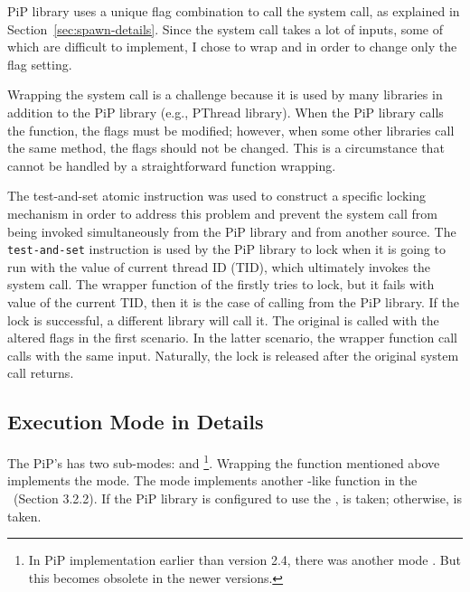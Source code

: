 PiP library uses a unique flag combination to call the
 system call, as explained in
Section~\ref{sec:spawn-details}. Since the  system
call takes a lot of inputs, some of which are difficult to implement,
I chose to wrap  and  in
order to change only the flag setting.   

Wrapping the  system call is a challenge because it
is used by many libraries in addition to the PiP library (e.g.,
PThread library). When the PiP library calls the function, the flags
must be modified; however, when some other libraries call the same
method, the flags should not be changed. This is a circumstance that
cannot be handled by a straightforward function wrapping.

The test-and-set atomic instruction was used to construct a specific
locking mechanism in order to address this problem and prevent the
 system call from being invoked simultaneously from
the PiP library and from another source. The {\tt test-and-set}
instruction is used by the PiP library to lock when it is going to run
 with the value of current thread ID (TID),
which ultimately invokes the  system call. The wrapper 
function of the  firstly tries to lock, but it fails
with value of the current TID, then it is the case of calling from the
PiP library. If the lock is successful, a different library will call
it. The original  is called with the altered flags in
the first scenario. In the latter scenario, the wrapper function call
calls  with the same input. Naturally, the lock is
released after the original  system call returns. 

\subsection{Execution Mode in Details}

The PiP's  has two sub-modes:
 and \footnote{In
  PiP implementation earlier than version 2.4, there was another mode 
. But this becomes obsolete in the newer
versions.}. Wrapping the  function mentioned above 
implements the  mode. The
 mode implements another
-like function in the \pipglibc\ (Section
3.2.2). If the PiP library is configured to use the \pipglibc,
 is taken; otherwise,
 is taken.  

